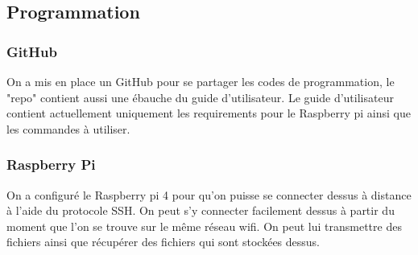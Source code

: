 \documentclass[a4paper, 11pt]{article}
\begin{document}
\subsection{Programmation}
\subsubsection{GitHub}
On a mis en place un GitHub pour se partager les codes de programmation, le "repo" contient aussi une ébauche du guide d'utilisateur.
Le guide d'utilisateur contient actuellement uniquement les requirements pour le Raspberry pi ainsi que les commandes à utiliser.
\subsubsection{Raspberry Pi}
On a configuré le Raspberry pi 4 pour qu'on puisse se connecter dessus à distance à l'aide du protocole SSH.
On peut s'y connecter facilement dessus à partir du moment que l'on se trouve sur le même réseau wifi.
On peut lui transmettre des fichiers ainsi que récupérer des fichiers qui sont stockées dessus.
\end{document}
